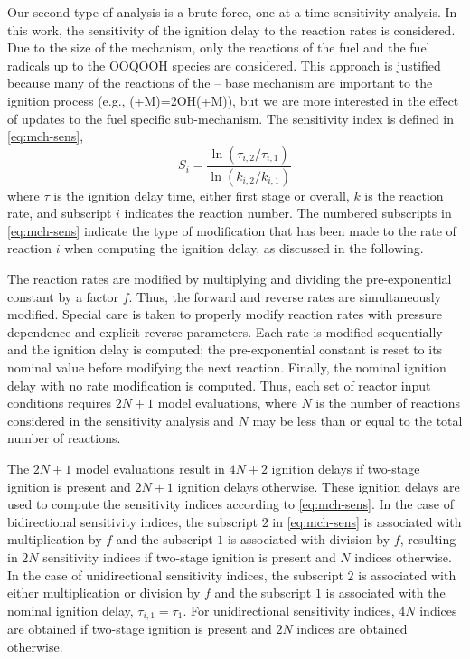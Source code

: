 \documentclass[../main.tex]{subfiles}
\begin{document}
Our second type of analysis is a brute force, one-at-a-time sensitivity
analysis. In this work, the sensitivity of the ignition delay to the reaction
rates is considered. Due to the size of the mechanism, only the reactions of
the fuel and the fuel radicals up to the OOQOOH species are considered. This
approach is justified because many of the reactions of the -- base
mechanism are important to the ignition process (e.g.,
(+M)=2OH(+M)), but we are more interested in the effect of updates to
the fuel specific sub-mechanism. The sensitivity index is defined in
\cref{eq:mch-sens},
%
\begin{equation}
    \label{eq:mch-sens}
    S_i = \frac{\ln\left(\tau_{i,2}/\tau_{i,1}\right)}{\ln\left(k_{i,2}/k_{i,1}\right)}
\end{equation}
%
where $\tau$ is the ignition delay time, either first stage or overall, $k$ is
the reaction rate, and subscript $i$ indicates the reaction number. The
numbered subscripts in \cref{eq:mch-sens} indicate the type of modification
that has been made to the rate of reaction $i$ when computing the ignition
delay, as discussed in the following.

The reaction rates are modified by multiplying and dividing the pre-exponential
constant by a factor $f$. Thus, the forward and reverse rates are
simultaneously modified. Special care is taken to properly modify reaction
rates with pressure dependence and explicit reverse parameters. Each rate is
modified sequentially and the ignition delay is computed; the pre-exponential
constant is reset to its nominal value before modifying the next reaction.
Finally, the nominal ignition delay with no rate modification is computed.
Thus, each set of reactor input conditions requires $2N+1$ model evaluations,
where $N$ is the number of reactions considered in the sensitivity analysis
and $N$ may be less than or equal to the total number of reactions.

The $2N+1$ model evaluations result in $4N+2$ ignition delays if two-stage
ignition is present and $2N+1$ ignition delays otherwise. These ignition delays
are used to compute the sensitivity indices according to \cref{eq:mch-sens}.
In the case of bidirectional sensitivity indices, the subscript $2$ in
\cref{eq:mch-sens} is associated with multiplication by $f$ and the subscript
$1$ is associated with division by $f$, resulting in $2N$ sensitivity indices if
two-stage ignition is present and $N$ indices otherwise. In the case of
unidirectional sensitivity indices, the subscript $2$ is associated with either
multiplication or division by $f$ and the subscript $1$ is associated with the
nominal ignition delay, $\tau_{i,1}=\tau_1$. For unidirectional sensitivity
indices, $4N$ indices are obtained if two-stage ignition is present and
$2N$ indices are obtained otherwise.
\end{document}
